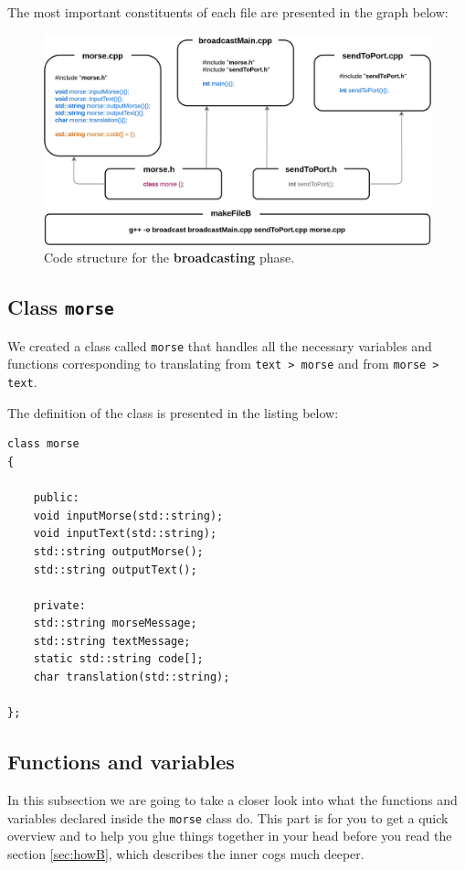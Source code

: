\documentclass[12pt]{report}
\begin{document}
The most important constituents of each file are presented in the graph below:

\begin{figure}[H]
\centering\includegraphics[width=14.5cm]{bCodeStructure}
\caption{Code structure for the \textbf{broadcasting} phase.}				
\label{fig:br_code}
\end{figure}

\subsection{Class \texttt{morse}}

We created a class called \verb|morse| that handles all the necessary variables and functions corresponding to translating from \verb|text > morse| and from \verb|morse > text|.

The definition of the class is presented in the listing below:

\newpage

\begin{lstlisting}
class morse
{

	public:
	void inputMorse(std::string);
	void inputText(std::string);
	std::string outputMorse();
	std::string outputText();

	private:
	std::string morseMessage;
	std::string textMessage;
	static std::string code[];
	char translation(std::string);

};
\end{lstlisting}

\subsection{Functions and variables}

In this subsection we are going to take a closer look into what the functions and variables declared inside the \verb|morse| class do. This part is for you to get a quick overview and to help you glue things together in your head before you read the section \ref{sec:howB}, which describes the inner cogs much deeper.
\end{document}
